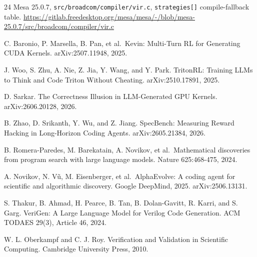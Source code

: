 \documentclass[conference]{IEEEtran}
\begin{document}
\begin{thebibliography}{24}
 Mesa 25.0.7, \texttt{src/broadcom/compiler/vir.c},
\texttt{strategies{[}{]}} compile-fallback table.
\url{https://gitlab.freedesktop.org/mesa/mesa/-/blob/mesa-25.0.7/src/broadcom/compiler/vir.c}

 C. Baronio, P. Marsella, B. Pan, et al.~Kevin: Multi-Turn RL
for Generating CUDA Kernels. arXiv:2507.11948, 2025.

 J. Woo, S. Zhu, A. Nie, Z. Jia, Y. Wang, and Y. Park. TritonRL:
Training LLMs to Think and Code Triton Without Cheating.
arXiv:2510.17891, 2025.

 D. Sarkar. The Correctness Illusion in LLM-Generated GPU
Kernels. arXiv:2606.20128, 2026.

 B. Zhao, D. Srikanth, Y. Wu, and Z. Jiang. SpecBench: Measuring
Reward Hacking in Long-Horizon Coding Agents. arXiv:2605.21384, 2026.

 B. Romera-Paredes, M. Barekatain, A. Novikov, et
al.~Mathematical discoveries from program search with large language
models. Nature 625:468-475, 2024.

 A. Novikov, N. Vũ, M. Eisenberger, et al.~AlphaEvolve: A coding
agent for scientific and algorithmic discovery. Google DeepMind, 2025.
arXiv:2506.13131.

 S. Thakur, B. Ahmad, H. Pearce, B. Tan, B. Dolan-Gavitt, R.
Karri, and S. Garg. VeriGen: A Large Language Model for Verilog Code
Generation. ACM TODAES 29(3), Article 46, 2024.

 W. L. Oberkampf and C. J. Roy. Verification and Validation in
Scientific Computing. Cambridge University Press, 2010.
\end{thebibliography}
\end{document}
